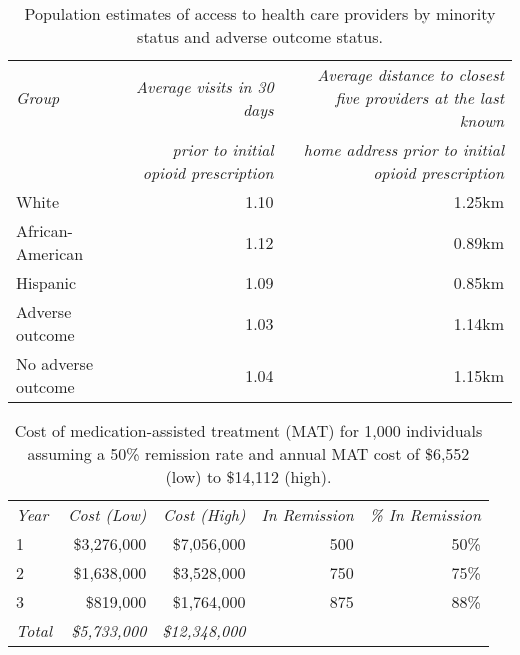 \documentclass[9pt,twoside]{pnas-new}
\begin{document}
\begin{table}
\caption{Population estimates of access to health care providers by minority status and adverse outcome status.}
\centering
\begin{tabular}{lrr}
\em Group & \em Average visits in 30 days & \em Average distance to closest five providers at the last known \\
 & \em prior to initial opioid prescription & \em home address prior to initial opioid prescription \\[0.5em]
White & 1.10 & 1.25km \\
African-American & 1.12 & 0.89km \\
Hispanic & 1.09 & 0.85km \\[0.5em]
Adverse outcome & 1.03 & 1.14km \\
No adverse outcome & 1.04 & 1.15km
\end{tabular}
\end{table}

\begin{table}
\caption{Cost of medication-assisted treatment (MAT) for 1,000 individuals assuming a 50\% remission rate and annual MAT cost of \$6,552 (low) to \$14,112 (high).}
\centering
\begin{tabular}{lrrrr}
\em Year & \em Cost (Low) & \em Cost (High) & \em In Remission & \em \% In Remission \\[0.5em]
1 & \$3,276,000 & \$7,056,000 & 500 & 50\% \\
2 & \$1,638,000 & \$3,528,000 & 750 & 75\% \\
3 & \$819,000 & \$1,764,000 & 875 & 88\% \\[0.5em]
\em Total & \em \$5,733,000 & \em \$12,348,000 & &
\end{tabular}
\end{table}
\end{document}

